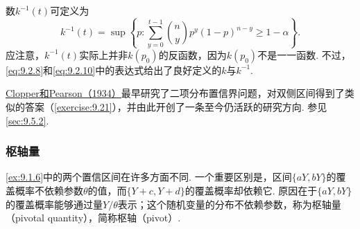 \begin{example}[二项分布单侧置信界]
数$k^{-1}(t)$可定义为
\begin{equation}\label{eq:9.2.10}
k^{-1}(t)=\sup\left\{p:\sum_{y=0}^{t-1}\binom ny p^y(1-p)^{n-y}\ge1-\alpha\right\}.
\end{equation}
应注意，$k^{-1}(t)$实际上并非$k(p_0)$的反函数，因为$k(p_0)$不是一一函数. 不过，\eqref{eq:9.2.8}和\eqref{eq:9.2.10}中的表达式给出了良好定义的$k$与$k^{-1}$.

\hyperref[bib:source79]{Clopper和Pearson（1934）}最早研究了二项分布置信界问题，对双侧区间得到了类似的答案（\autoref{exercise:9.21}），并由此开创了一条至今仍活跃的研究方向. 参见\autoref{sec:9.5.2}.
\end{example}
\subsubsection{枢轴量}\label{sec:9.2.2}
\autoref{ex:9.1.6}中的两个置信区间在许多方面不同. 一个重要区别是，区间$\{aY,bY\}$的覆盖概率不依赖参数$\theta$的值，而$\{Y+c,Y+d\}$的覆盖概率却依赖它. 原因在于$\{aY,bY\}$的覆盖概率能够通过量$Y/\theta$表示；这个随机变量的分布不依赖参数，称为枢轴量（pivotal quantity），简称枢轴（pivot）.

